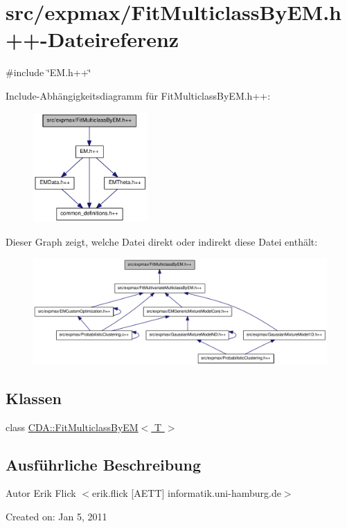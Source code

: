 \hypertarget{FitMulticlassByEM_8h_09_09}{
\section{src/expmax/FitMulticlassByEM.h++-\/Dateireferenz}
\label{FitMulticlassByEM_8h_09_09}
}
{\ttfamily \#include \char`\"{}EM.h++\char`\"{}}\par
Include-\/Abhängigkeitsdiagramm für FitMulticlassByEM.h++:\nopagebreak
\begin{figure}[H]
\begin{center}
\leavevmode
\includegraphics[width=124pt]{FitMulticlassByEM_8h_09_09__incl}
\end{center}
\end{figure}
Dieser Graph zeigt, welche Datei direkt oder indirekt diese Datei enthält:\nopagebreak
\begin{figure}[H]
\begin{center}
\leavevmode
\includegraphics[width=380pt]{FitMulticlassByEM_8h_09_09__dep__incl}
\end{center}
\end{figure}
\subsection*{Klassen}
\begin{DoxyCompactItemize}
\item 
class \hyperlink{classCDA_1_1FitMulticlassByEM}{CDA::FitMulticlassByEM$<$ T $>$}
\end{DoxyCompactItemize}


\subsection{Ausführliche Beschreibung}
\begin{DoxyAuthor}{Autor}
Erik Flick $<$erik.flick \mbox{[}AETT\mbox{]} informatik.uni-\/hamburg.de$>$
\end{DoxyAuthor}
Created on: Jan 5, 2011 